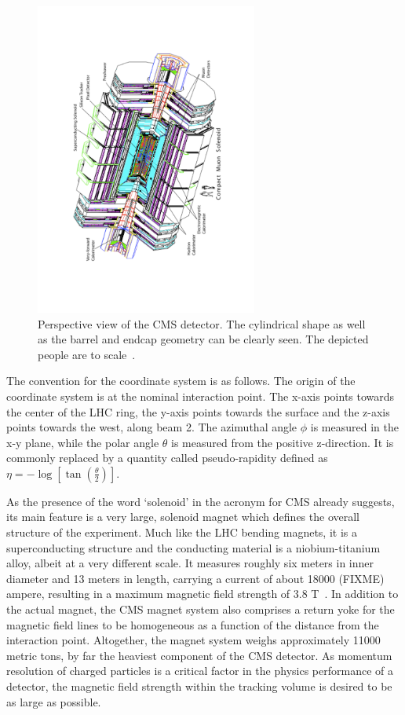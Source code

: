 \begin{figure}[h!]
    \centering
    \includegraphics[width=0.65\textwidth]{../figs/cms_scheme.pdf}
    \caption{Perspective view of the CMS detector. The cylindrical shape as well as the barrel and endcap
geometry can be clearly seen. The depicted people are to scale~\cite{cmsdetector}.}
    \label{fig:cms_scheme}
\end{figure}

The convention for the coordinate system is as follows. The origin of the coordinate system is at the nominal
interaction point. The x-axis points towards the center of the LHC ring, the y-axis points towards the surface
and the z-axis points towards the west, along beam 2. The azimuthal angle $\phi$ is measured in the x-y plane, while the
polar angle $\theta$ is measured from the positive z-direction. It is commonly replaced by a quantity called 
pseudo-rapidity defined as $\eta = - \log \left[ \tan \left(\frac{\theta}{2} \right) \right]$.



As the presence of the word `solenoid' in the acronym for CMS already suggests, its main feature is a very large, solenoid
magnet which defines the overall structure of the experiment. Much like the LHC bending magnets, it is a superconducting
structure and the conducting material is a niobium-titanium alloy, albeit at a very different scale. It measures roughly six
meters in inner diameter and 13 meters in length, carrying a current of about \num{18000} (FIXME) ampere, resulting in a
maximum magnetic field strength of 3.8 T~\cite{magnettdr}. In addition to the actual magnet, the CMS magnet system
also comprises a return yoke for the magnetic field lines to be homogeneous as a function of the distance from the interaction
point. Altogether, the magnet system weighs approximately \num{11000} metric tons, by far the heaviest component of the 
CMS detector. As momentum resolution of charged particles is a critical factor in the physics performance of a detector, the magnetic
field strength within the tracking volume is desired to be as large as possible. 

